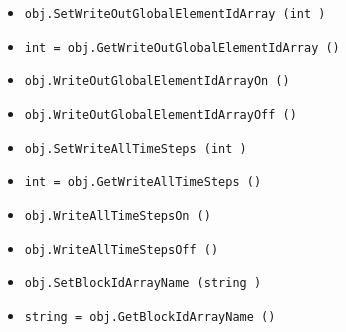 \begin{itemize}
\item  \verb|obj.SetWriteOutGlobalElementIdArray (int )|

\item  \verb|int = obj.GetWriteOutGlobalElementIdArray ()|

\item  \verb|obj.WriteOutGlobalElementIdArrayOn ()|

\item  \verb|obj.WriteOutGlobalElementIdArrayOff ()|

\item  \verb|obj.SetWriteAllTimeSteps (int )|

\item  \verb|int = obj.GetWriteAllTimeSteps ()|

\item  \verb|obj.WriteAllTimeStepsOn ()|

\item  \verb|obj.WriteAllTimeStepsOff ()|

\item  \verb|obj.SetBlockIdArrayName (string )|

\item  \verb|string = obj.GetBlockIdArrayName ()|

\end{itemize}
